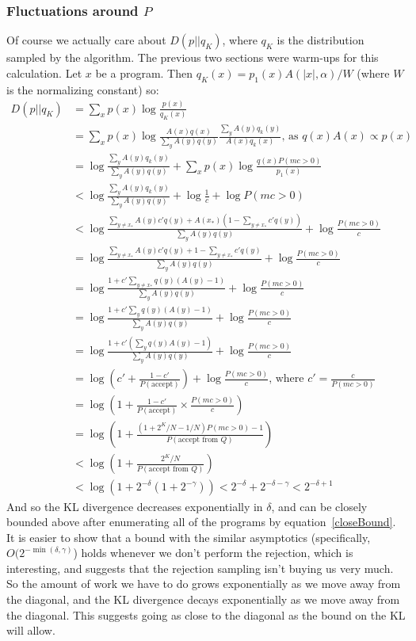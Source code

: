 \documentclass{article}
\begin{document}
\subsubsection{Fluctuations around $P$}
Of course we actually care about $D(p||q_K)$, where $q_K$ is the distribution sampled by the algorithm.
The previous two sections were warm-ups for this calculation.
Let $x$ be a program.
Then $q_K(x) = p_1(x)A(|x|,\alpha)/W$ (where $W$ is the normalizing constant)
so:
\begin{align}
  D(p||q_K)& = \sum_x p(x)\log \frac{p(x)}{q_K(x)}\\
  & = \sum_x p(x)\log \frac{A(x)q(x)}{\sum_y A(y)q(y)}\frac{\sum_y A(y)q_k(y)}{A(x)q_k(x)}\text{, as }q(x)A(x)\propto p(x)\\
  & = \log \frac{\sum_y A(y)q_k(y)}{\sum_y A(y)q(y)}+\sum_x p(x)\log \frac{q(x)P(mc > 0)}{p_1(x)}\\
  &  <  \log \frac{\sum_y A(y)q_k(y)}{\sum_y A(y)q(y)} + \log \frac{1}{c} + \log P(mc > 0)\\
  & < \log \frac{\sum_{y\not= x_*} A(y)c'q(y)  +A(x_*)(1 - \sum_{y\not= x_*} c'q(y))}{\sum_y A(y)q(y)} + \log\frac{P(mc > 0)}{c} \\
  &  =  \log \frac{\sum_{y\not= x_*} A(y)c'q(y) +1 - \sum_{y\not= x_*} c'q(y)}{\sum_y A(y)q(y)} + \log\frac{P(mc > 0)}{c} \\
  &  =  \log \frac{1 + c'\sum_{y\not= x_*} q(y)(A(y)-1)}{\sum_y A(y)q(y)} + \log\frac{P(mc > 0)}{c} \\
  &  =  \log \frac{1 + c'\sum_{y} q(y)(A(y)-1)}{\sum_y A(y)q(y)} + \log\frac{P(mc > 0)}{c} \\
  &  =  \log \frac{1 + c'(\sum_{y} q(y)A(y) - 1)}{\sum_y A(y)q(y)} + \log\frac{P(mc > 0)}{c} \\
  &  =  \log \left( c' + \frac{1 - c'}{P(\text{accept})} \right) + \log\frac{P(mc > 0)}{c} \text{, where }c' = \frac{c}{P(mc>0)}\\
  & = \log  \left( 1 + \frac{1 - c'}{P(\text{accept})}\times \frac{P(mc > 0)}{c} \right)\\
  & = \log  \left( 1 + \frac{(1 + 2^K/N - 1/N)P(mc > 0) - 1}{P(\text{accept from $Q$})} \right) \label{closeBound}\\
  & < \log  \left( 1 + \frac{2^K/N}{P(\text{accept from $Q$})} \right) \\
  & < \log  \left( 1 + 2^{ - \delta}(1 + 2^{ - \gamma}) \right)  < 2^{ - \delta} + 2^{ - \delta - \gamma} < 2^{ - \delta + 1}
\end{align}
And so the KL divergence decreases exponentially in $\delta$, and can be closely bounded above after enumerating all of the programs by equation~\ref{closeBound}.
It is easier to show that a bound with the similar asymptotics (specifically, $O(2^{-\min (\delta, \gamma )}$) holds whenever we don't perform the rejection,
which is interesting,
and suggests that the rejection sampling isn't buying us very much.
So the amount of work we have to do grows exponentially as we move away from the diagonal,
and the KL divergence decays exponentially as we move away from the diagonal.
This suggests going as close to the diagonal as the bound on the KL will allow.
\end{document}
